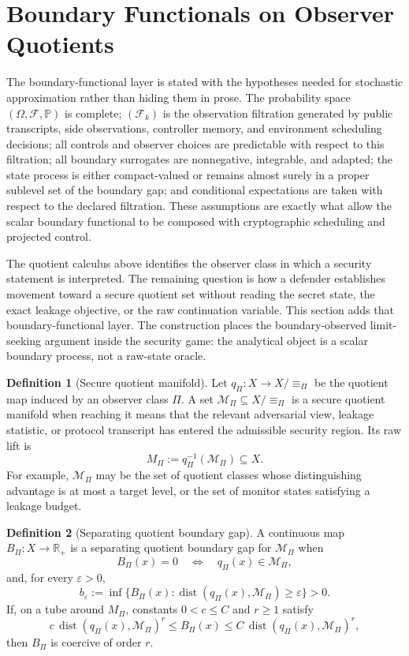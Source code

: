\documentclass[11pt]{article}
\theoremstyle{definition}
\newtheorem{definition}{Definition}[section]
\theoremstyle{plain}
\theoremstyle{remark}
\newcommand{\Prb}{\mathbb{P}}
\newcommand{\R}{\mathbb{R}}
\newcommand{\cF}{\mathcal{F}}
\newcommand{\cM}{\mathcal{M}}
\newcommand{\eps}{\varepsilon}
\newcommand{\eqobs}{\equiv_{\Pi}}
\begin{document}
\section{Boundary Functionals on Observer Quotients}

The boundary-functional layer is stated with the hypotheses needed for stochastic approximation rather than hiding them in prose. The probability space $(\Omega,\cF,\Prb)$ is complete; $(\cF_k)$ is the observation filtration generated by public transcripts, side observations, controller memory, and environment scheduling decisions; all controls and observer choices are predictable with respect to this filtration; all boundary surrogates are nonnegative, integrable, and adapted; the state process is either compact-valued or remains almost surely in a proper sublevel set of the boundary gap; and conditional expectations are taken with respect to the declared filtration. These assumptions are exactly what allow the scalar boundary functional to be composed with cryptographic scheduling and projected control.


The quotient calculus above identifies the observer class in which a security statement is interpreted. The remaining question is how a defender establishes movement toward a secure quotient set without reading the secret state, the exact leakage objective, or the raw continuation variable. This section adds that boundary-functional layer. The construction places the boundary-observed limit-seeking argument inside the security game: the analytical object is a scalar boundary process, not a raw-state oracle.

\begin{definition}[Secure quotient manifold]
Let $q_\Pi:X\to X/{\eqobs}$ be the quotient map induced by an observer class $\Pi$. A set $\cM_\Pi\subseteq X/{\eqobs}$ is a secure quotient manifold when reaching it means that the relevant adversarial view, leakage statistic, or protocol transcript has entered the admissible security region. Its raw lift is
\[
    M_\Pi:=q_\Pi^{-1}(\cM_\Pi)\subseteq X.
\]
For example, $\cM_\Pi$ may be the set of quotient classes whose distinguishing advantage is at most a target level, or the set of monitor states satisfying a leakage budget.
\end{definition}

\begin{definition}[Separating quotient boundary gap]
A continuous map $B_\Pi:X\to\R_+$ is a separating quotient boundary gap for $\cM_\Pi$ when
\[
    B_\Pi(x)=0 \quad\Longleftrightarrow\quad q_\Pi(x)\in\cM_\Pi,
\]
and, for every $\eps>0$,
\[
    b_\eps:=\inf\{B_\Pi(x):\operatorname{dist}(q_\Pi(x),\cM_\Pi)\ge \eps\}>0.
\]
If, on a tube around $M_\Pi$, constants $0<c\le C$ and $r\ge 1$ satisfy
\[
    c\,\operatorname{dist}(q_\Pi(x),\cM_\Pi)^r\le B_\Pi(x)\le C\,\operatorname{dist}(q_\Pi(x),\cM_\Pi)^r,
\]
then $B_\Pi$ is coercive of order $r$.
\end{definition}
\end{document}
